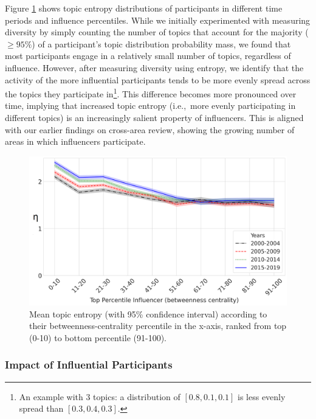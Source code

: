 \documentclass[twocolumn,10pt]{article}
\newlength{\figureWidthOneColumn}
\begin{document}
Figure \ref{fig:topic_diversity} shows topic entropy distributions of
participants in different time periods and influence percentiles. While we
initially experimented with measuring diversity by simply counting the
number of topics that account for the majority ($ \geq 95\% $) of a
participant's topic distribution probability mass, we found that most
participants engage in a relatively small number of topics, regardless of
influence. However, after measuring diversity using entropy, we identify
that the activity of the more influential participants tends to be more
evenly spread across the topics they participate in\footnote{An example
with 3 topics: a distribution of $[0.8, 0.1, 0.1]$ is less evenly spread
than $[0.3, 0.4, 0.3]$.}. This difference becomes more pronounced over
time, implying that increased topic entropy (i.e.,~more evenly participating
in different topics) is an increasingly salient property of influencers.
This is aligned with our earlier findings on cross-area review, showing the
growing number of areas in which influencers participate.


\begin{figure}
  \centering
  \includegraphics[width=\figureWidthOneColumn]{figures-prev/icwsm-2022/topic-div.png}
  \caption{
    Mean topic entropy (with 95\% confidence interval) according to their
    betweenness-centrality percentile in the x-axis, ranked from top (0-10)
    to bottom percentile (91-100).
  }
  \label{fig:topic_diversity}
\end{figure}


\subsubsection{Impact of Influential Participants}
\label{subsec:impact_influence}
\end{document}
